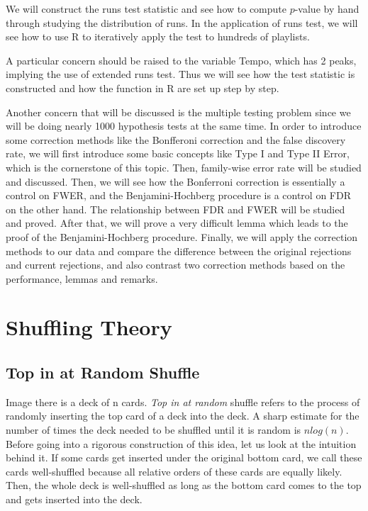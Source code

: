 \documentclass[12pt]{article}
\theoremstyle{plain}
\theoremstyle{definition}
\theoremstyle{remark}
\begin{document}
We will construct the runs test statistic and see how to compute $p$-value by hand through studying the distribution of runs. In the application of runs test, we will see how to use R to iteratively apply the test to hundreds of playlists.

A particular concern should be raised to the variable Tempo, which has 2 peaks, implying the use of extended runs test. Thus we will see how the test statistic is constructed and how the function in R are set up step by step. 

Another concern that will be discussed is the multiple testing problem since we will be doing nearly 1000 hypothesis tests at the same time. In order to introduce some correction methods like the Bonfferoni correction and the false discovery rate, we will first introduce some basic concepts like Type I and Type II Error, which is the cornerstone of this topic. Then, family-wise error rate will be studied and discussed. Then, we will see how the Bonferroni correction is essentially a control on FWER, and the Benjamini-Hochberg procedure is a control on FDR on the other hand. The relationship between FDR and FWER will be studied and proved. After that, we will prove a very difficult lemma which leads to the proof of the Benjamini-Hochberg procedure. Finally, we will apply the correction methods to our data and compare the difference between the original rejections and current rejections, and also contrast two correction methods based on the performance, lemmas and remarks.
\clearpage
\section{Shuffling Theory}
\subsection{Top in at Random Shuffle}

Image there is a deck of n cards. \textit{Top in at random}\cite[Example~1 on \pno~333]{1.1} shuffle refers to the process of randomly inserting the top card of a deck into the deck. A sharp estimate for the number of times the deck needed to be shuffled until it is random is $nlog(n)$. Before going into a rigorous construction of this idea, let us look at the intuition behind it. If some cards get inserted under the original bottom card, we call these cards well-shuffled because all relative orders of these cards are equally likely. Then, the whole deck is well-shuffled as long as the bottom card comes to the top and gets inserted into the deck. 
\end{document}
